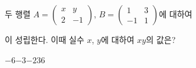 두 행렬 $A=\begin{pmatrix} x & y \\ 2 & -1 \end{pmatrix}$, $B=\begin{pmatrix} 1 & 3 \\ -1 & 1 \end{pmatrix}$에 대하여 \par\smallskip{}\par\smallskip\noindent 이 성립한다. 이때 실수 $x$, $y$에 대하여 $xy$의 값은?
\begin{choices32}{$-6$}{$-3$}{$-2$}{$3$}{$6$}\end{choices32}

